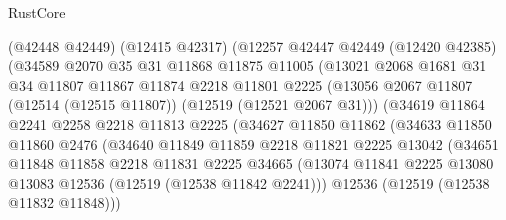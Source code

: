 \begin{lexlean}{RustCore}
\begin{coremodule}
                      (@42448 @42449)
                      (@12415 @42317)
                      (@12257
                        @42447
                        @42449
                        (@12420 @42385)
                        (@34589
                          @2070
                          @35
                          @31
                          @11868
                          @11875
                          @11005
                          (@13021
                            @2068
                            @1681
                            @31
                            @34
                            @11807
                            @11867
                            @11874
                            @2218
                            @11801
                            @2225
                            (@13056
                              @2067
                              @11807
                              (@12514 (@12515 @11807))
                              (@12519 (@12521 @2067 @31)))
                            (@34619
                              @11864
                              @2241
                              @2258
                              @2218
                              @11813
                              @2225
                              (@34627
                                @11850
                                @11862
                                (@34633
                                  @11850
                                  @11860
                                  @2476
                                  (@34640
                                    @11849
                                    @11859
                                    @2218
                                    @11821
                                    @2225
                                    @13042
                                    (@34651
                                      @11848
                                      @11858
                                      @2218
                                      @11831
                                      @2225
                                      @34665
                                      (@13074
                                        @11841
                                        @2225
                                        @13080
                                        @13083
                                        @12536
                                        (@12519 (@12538 @11842 @2241)))
                                      @12536
                                      (@12519 (@12538 @11832 @11848)))

\end{coremodule}
\end{lexlean}

